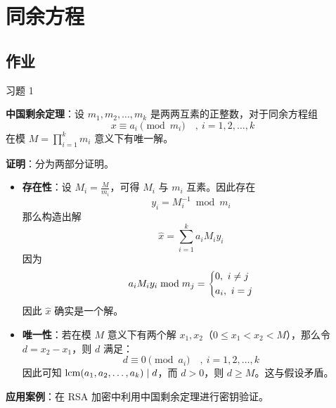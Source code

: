 \section{同余方程}

\subsection{作业}

\begin{problem}
	习题 1
	\begin{solution}
		\textbf{中国剩余定理}：设 $m_1, m_2, \dots, m_k$ 是两两互素的正整数，对于同余方程组
		$$
		x \equiv a_i \pmod{m_i} \quad,\ i = 1, 2, \dots, k
		$$
		在模 $M = \prod_{i = 1}^{k} m_i$ 意义下有唯一解。

		\textbf{证明}：分为两部分证明。
		\begin{itemize}
			\item \textbf{存在性}：设 $M_i = \frac{M}{m_i}$，可得 $M_i$ 与 $m_i$ 互素。因此存在
			$$
			y_i = M_i^{-1} \bmod m_i
			$$
			那么构造出解
			$$
			\hat{x} = \sum_{i = 1}^{k} a_i M_i y_i
			$$
			因为
			$$
			a_i M_i y_i \bmod m_j = \begin{dcases}
				0,\ i \neq j \\
				a_i,\ i = j
			\end{dcases}
			$$
			因此 $\hat{x}$ 确实是一个解。

			\item \textbf{唯一性}：若在模 $M$ 意义下有两个解 $x_1, x_2$（$0 \le x_1 < x_2 < M$），那么令 $d = x_2 - x_1$，则 $d$ 满足：
			$$
			d \equiv 0 \pmod{a_i} \quad,\ i = 1, 2, \dots, k
			$$
			因此可知 $\operatorname{lcm}(a_1, a_2, \dots, a_k) \mid d$，而 $d > 0$，则 $d \ge M$。这与假设矛盾。
		\end{itemize}

		\textbf{应用案例}：在 RSA 加密中利用中国剩余定理进行密钥验证。
	\end{solution}
\end{problem}


